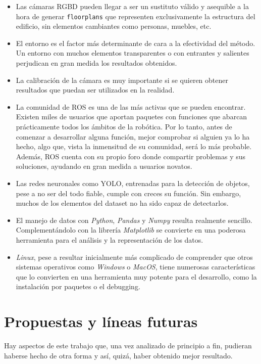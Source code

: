 \begin{itemize}

	\item Las cámaras RGBD pueden llegar a ser un sustituto válido y asequible a la hora de generar \texttt{floorplans} que representen exclusivamente la estructura del edificio, sin elementos cambiantes como personas, muebles, etc.
	\item El entorno es el factor más determinante de cara a la efectividad del método. Un entorno con muchos elementos transparentes o con entrantes y salientes perjudican en gran medida los resultados obtenidos.
	\item La calibración de la cámara es muy importante si se quieren obtener resultados que puedan ser utilizados en la realidad.
	\item La comunidad de ROS es una de las más activas que se pueden encontrar. Existen miles de usuarios que aportan paquetes con funciones que abarcan prácticamente todos los ámbitos de la robótica. Por lo tanto, antes de comenzar a desarrollar alguna función, mejor comprobar si alguien ya lo ha hecho, algo que, vista la inmensitud de su comunidad, será lo más probable. Además, ROS cuenta con su propio foro donde compartir problemas y sus soluciones, ayudando en gran medida a usuarios novatos.
	\item Las redes neuronales como YOLO, entrenadas para la detección de objetos, pese a no ser del todo fiable, cumple con creces su función. Sin embargo, muchos de los elementos del dataset no ha sido capaz de detectarlos.
	\item El manejo de datos con \textit{Python}, \textit{Pandas}
 y \textit{Numpy} resulta realmente sencillo. Complementándolo con la librería \textit{Matplotlib} se convierte en una poderosa herramienta para el análisis y la representación de los datos.
 	\item \textit{Linux}, pese a resultar inicialmente más complicado de comprender que otros sistemas operativos como \textit{Windows} o \textit{MacOS}, tiene numerosas características que lo convierten en una herramienta muy potente para el desarrollo, como la instalación por paquetes o el debugging.

\end{itemize}

\section{Propuestas y líneas futuras}

Hay aspectos de este trabajo que, una vez analizado de principio a fin, pudieran haberse hecho de otra forma y así, quizá, haber obtenido mejor resultado.\\

